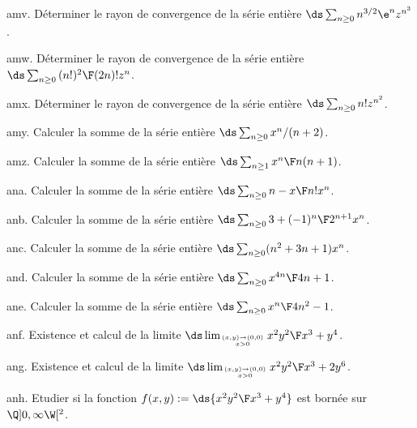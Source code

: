 \exo [Level=2,Fight=0,Learn=0,Field=\SériesEntières,Type=\Exercices,Origin=] amv. 
Déterminer le rayon de convergence de la  série entière $\ds\sum_{n\ge0}n^{3/2}\e^nz^{n^3}$.

\exo [Level=2,Fight=0,Learn=0,Field=\SériesEntières,Type=\Exercices,Origin=] amw. 
Déterminer le rayon de convergence de la  série entière $\ds\sum_{n\ge0}{(n!)^2\F(2n)!}z^n$.

\exo [Level=2,Fight=0,Learn=0,Field=\SériesEntières,Type=\Exercices,Origin=] amx. 
Déterminer le rayon de convergence de la  série entière $\ds\sum_{n\ge0}n!z^{n^2}$. 

\exo [Level=2,Fight=1,Learn=0,Field=\SériesEntières,Type=\Exercices,Origin=] amy. 
Calculer la somme de la série entière $\ds\sum_{n\ge0}x^n/(n+2)$.

\exo [Level=2,Fight=1,Learn=0,Field=\SériesEntières,Type=\Exercices,Origin=] amz. 
Calculer la somme de la série entière $\ds\sum_{n\ge1}{x^n\F n(n+1)}$.

\exo [Level=2,Fight=1,Learn=0,Field=\SériesEntières,Type=\Exercices,Origin=] ana. 
Calculer la somme de la série entière $\ds\sum_{n\ge0}{n-x\F n!}x^n$.

\exo [Level=2,Fight=1,Learn=0,Field=\SériesEntières,Type=\Exercices,Origin=] anb. 
Calculer la somme de la série entière $\ds\sum_{n\ge0}{3+(-1)^n\F 2^{n+1}}x^n$.

\exo [Level=2,Fight=1,Learn=0,Field=\SériesEntières,Type=\Exercices,Origin=] anc. 
Calculer la somme de la série entière $\ds\sum_{n\ge0}(n^2+3n+1)x^n$.

\exo [Level=2,Fight=1,Learn=0,Field=\SériesEntières,Type=\Exercices,Origin=] and. 
Calculer la somme de la série entière $\ds\sum_{n\ge0}{x^{4n}\F 4n+1}$.

\exo [Level=2,Fight=1,Learn=0,Field=\SériesEntières,Type=\Exercices,Origin=] ane. 
Calculer la somme de la série entière $\ds\sum_{n\ge0}{x^n\F4n^2-1}$. 

\exo [Level=2,Fight=2,Learn=2,Field=\FonctionsDePlusieursVariables,Type=\TravauxDirigés,Origin=] anf. 
Existence et calcul de la limite $\ds \lim_{(x,y)\to(0,0)\atop x>0}{x^2y^2\F x^3+y^4}$.

\exo [Level=2,Fight=2,Learn=2,Field=\FonctionsDePlusieursVariables,Type=\TravauxDirigés,Origin=] ang. 
Existence et calcul de la limite $\ds \lim_{(x,y)\to(0,0)\atop x>0}{x^2y^2\F x^3+2y^6}$. 

\exo [Level=2,Fight=2,Learn=2,Field=\FonctionsDePlusieursVariables,Type=\TravauxDirigés,Origin=] anh. 
Etudier si la fonction  $f(x,y):=\ds{x^2y^2\F x^3+y^4}$ est bornée sur $\Q]0,\infty\W[^2$.
 
